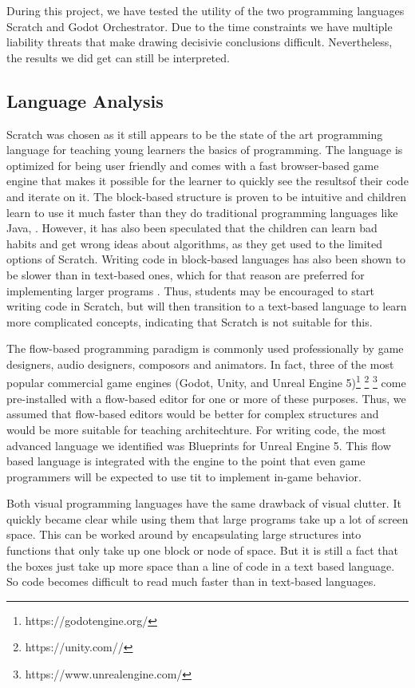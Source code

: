 During this project, we have tested the utility of the two
programming languages Scratch and Godot Orchestrator.
Due to the time
constraints we have multiple liability threats that make drawing
decisivie conclusions difficult.
Nevertheless, the results we did get
can still be interpreted.

\subsection{Language Analysis}
Scratch was chosen as it still appears to be the state of the art
programming language for teaching young learners the basics of
programming.
The language is optimized for being user friendly and
comes with a fast browser-based game engine that makes it possible
for the learner to quickly see the resultsof their code and iterate
on it.
The block-based structure is proven to be intuitive and
children learn to use it much faster than they do traditional
programming languages like Java\cite{programming-for-all}, \cite{weintrop_block_2015}.
However, it has also been speculated that the
children can learn bad habits and get wrong ideas about algorithms,
as they get used to the limited options of Scratch\cite{weintrop_block_2015}.
Writing code in
block-based languages has also been shown to be slower than in
text-based ones, which for that reason are preferred for implementing
larger programs \cite{weintrop_block_2015}. Thus, students may be encouraged to start writing code in
Scratch, but will then transition to a text-based language to learn
more complicated concepts, indicating that Scratch is not suitable
for this.

The flow-based programming paradigm is commonly used professionally by
game designers, audio designers, composors and animators.
In fact,
three of the most popular commercial game engines (Godot, Unity, and
Unreal Engine 5)\footnote{https://godotengine.org/} \footnote{https://unity.com//} \footnote{https://www.unrealengine.com/} come pre-installed with a flow-based editor for one
or more of these purposes.
Thus, we assumed that flow-based editors
would be better for complex structures and would be more suitable for
teaching architechture.
For writing code, the most advanced language
we identified was Blueprints for Unreal Engine 5.
This flow based
language is integrated with the engine to the point that even game
programmers will be expected to use tit to implement in-game
behavior.

Both visual programming languages have the same drawback of visual
clutter.
It quickly became clear while using them that large programs
take up a lot of screen space. This can be worked around by
encapsulating large structures into functions that only take up one block or node of space.
But it is still a fact that the boxes just
take up more space than a line of code in a text based language.
So
code becomes difficult to read much faster than in text-based
languages.

